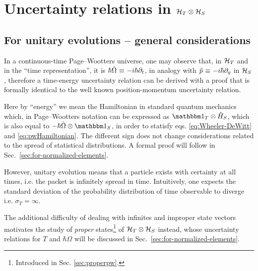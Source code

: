 \section{Uncertainty relations in $\mathcal{H}_T \otimes \mathcal{H}_S$}\label{sec:pw:uncertainty}

\subsection{For unitary evolutions -- general considerations}
\label{sec:pw:unitary-general}

In a continuous-time Page--Wootters universe,
one may observe that,
in $\mathcal{H}_T$ and in the ``time representation'',
it is $\hbar\hat{\Omega} \operatorname*{\,\equiv\,} -i\hbar\partial_{t}$,
in analogy with $\hat{p} \operatorname*{\,\equiv\,} -i\hbar\partial_{q}$ in $\mathcal{H}_S$,
therefore a time-energy uncertainty relation can be derived
with a proof that is formally identical to the well known
position-momentum uncertainty relation.

Here by ``energy'' we mean the Hamiltonian in standard quantum mechanics which,
in Page--Wootters notation can be expressed as $\idop_T \ox \op{H}_S$, which is also equal to
$-\hbar\op{\Omega} \ox \idop_S$, in order to statisfy eqs. \eqref{eq:Wheeler-DeWitt} and \eqref{eq:pwHamiltonian}.
The different sign does not change considerations related to the spread of statistical distributions.
A formal proof will follow in Sec.~\ref{sec:for-normalized-elements}.

However, unitary evolution means that a particle exists with
certainty at all times, i.e. the packet
is infinitely spread in time.
Intuitively,
one expects the standard deviation
of the probability distribution of time observable
to diverge i.e.
$\sigma_T = \infty$.


The additional difficulty of dealing with infinites and improper state vectors
motivates the study of \emph{proper} states\footnote{
  Introduced in Sec. \ref{sec:properpw}.
}
of $\mathcal{H}_T \otimes \mathcal{H}_S$
instead, whose uncertainty relations for $T$ and $\hbar\Omega$ will be discussed in Sec.~\ref{sec:for-normalized-elements}.


